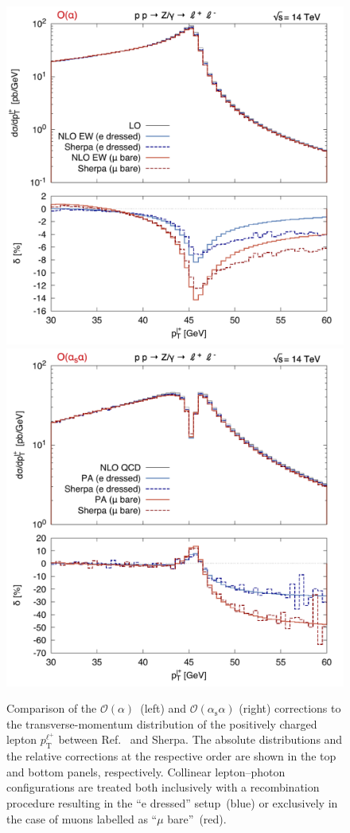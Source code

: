 \documentclass[11pt]{cernrep}
\newcommand{\order}{\ensuremath{\mathcal{O}}}
\newcommand{\alphas}{\ensuremath{\alpha_\mathrm{s}}}
\newcommand{\rT}{\ensuremath{\mathrm{T}}} %
\DeclareRobustCommand{\Plp}{{\ensuremath{\ell^+}}}
\begin{document}
\begin{figure}
  \includegraphics[width=.48\linewidth]{images/Z_ptl+2_LO.pdf} \hfill
  \includegraphics[width=.48\linewidth]{images/Z_ptl+2_NLO.pdf} 
  \caption{
    Comparison of the $\order(\alpha)$~(left) and $\order(\alphas\alpha)$ 
    (right) corrections to the transverse-momentum distribution of the 
    positively charged lepton $p_\rT^\Plp$ between 
    Ref.~\cite{Dittmaier:2015rxo} and Sherpa. The absolute distributions 
    and the relative corrections at the respective order are shown in the 
    top and bottom panels, respectively. Collinear lepton--photon 
    configurations are treated both inclusively with a recombination 
    procedure resulting in the ``e dressed'' setup~(blue) or exclusively in 
    the case of muons labelled as ``$\mu$ bare''~(red).
  }
  \label{fig:dyew:ptl}
\end{figure}
\end{document}
